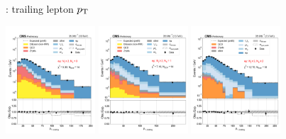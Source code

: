 \begin{frame}{}
\begin{tcolorbox}[colframe=NUpurple]{ \cem: trailing lepton $p_{\mathrm{T}}$}
\begin{center}
            \includegraphics[width=0.25\textwidth]{chapters/Analysis/sectionStatisticalAnalysis/figures/fit/emu_cat_gt2_eq0}
            \includegraphics[width=0.25\textwidth]{chapters/Analysis/sectionStatisticalAnalysis/figures/fit/emu_cat_gt2_eq1_a}
            \includegraphics[width=0.25\textwidth]{chapters/Analysis/sectionStatisticalAnalysis/figures/fit/emu_cat_gt2_gt2_a}
        \end{center}
    \end{tcolorbox}

\end{frame}

